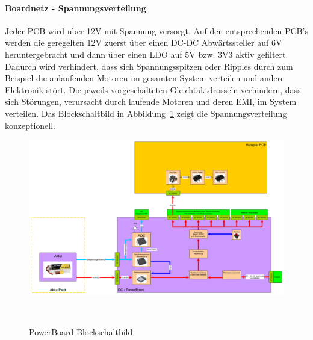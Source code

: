 \documentclass[main.tex]{subfiles} %
\begin{document}
\paragraph{Boardnetz - Spannungsverteilung}
Jeder PCB wird über 12V mit Spannung versorgt. Auf den entsprechenden PCB's
werden die geregelten 12V zuerst über einen DC-DC Abwärtssteller auf 6V
heruntergebracht und dann über einen LDO auf 5V bzw. 3V3 aktiv gefiltert.
Dadurch wird verhindert, dass sich Spannungsspitzen oder Ripples durch zum
Beispiel die anlaufenden Motoren im gesamten System verteilen und andere
Elektronik stört. Die jeweils vorgeschalteten Gleichtaktdrosseln verhindern,
dass sich Störungen, verursacht durch laufende Motoren und deren EMI, im System
verteilen. Das Blockschaltbild in Abbildung~\ref{PowerBoard_Blockschaltbild}
zeigt die Spannungsverteilung konzeptionell.

\begin{figure}[H]
    \centering
    \includegraphics[width = 1\linewidth]{fig_Boardnetz/PowerBoard-Blockschaltbild.pdf}
    \caption{PowerBoard Blockschaltbild}~\label{PowerBoard_Blockschaltbild}
\end{figure}
\end{document}
